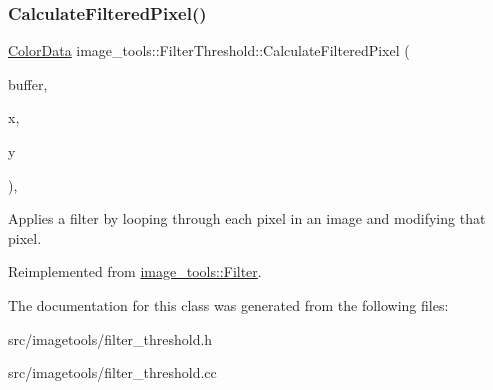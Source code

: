 \subsubsection{\texorpdfstring{Calculate\+Filtered\+Pixel()}{CalculateFilteredPixel()}}
{\footnotesize\ttfamily \hyperlink{classimage__tools_1_1ColorData}{Color\+Data} image\+\_\+tools\+::\+Filter\+Threshold\+::\+Calculate\+Filtered\+Pixel (\begin{DoxyParamCaption}\item[{\hyperlink{classimage__tools_1_1PixelBuffer}{Pixel\+Buffer} $\ast$}]{buffer,  }\item[{int}]{x,  }\item[{int}]{y }\end{DoxyParamCaption})\hspace{0.3cm}{\ttfamily [override]}, {\ttfamily [virtual]}}

Applies a filter by looping through each pixel in an image and modifying that pixel. 

Reimplemented from \hyperlink{classimage__tools_1_1Filter_a68d38fa12b87e20b81090cb380c0a307}{image\+\_\+tools\+::\+Filter}.



The documentation for this class was generated from the following files\+:\begin{DoxyCompactItemize}
\item 
src/imagetools/filter\+\_\+threshold.\+h\item 
src/imagetools/filter\+\_\+threshold.\+cc\end{DoxyCompactItemize}
